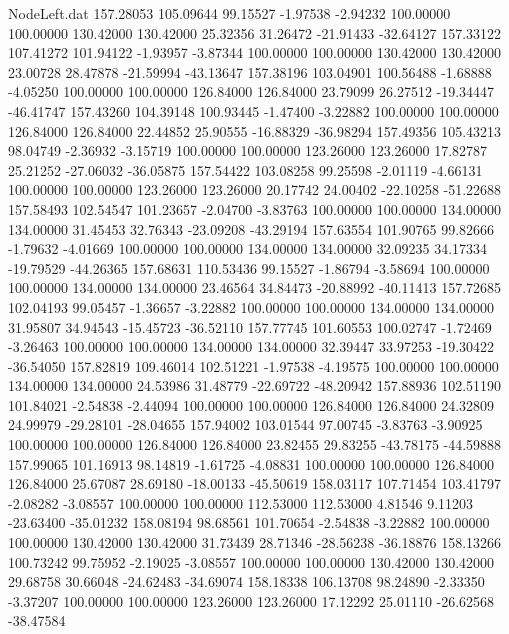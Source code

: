 \begin{filecontents}{NodeLeft.dat}
 157.28053  105.09644   99.15527    -1.97538   -2.94232  100.00000  100.00000  130.42000  130.42000   25.32356   31.26472  -21.91433  -32.64127
 157.33122  107.41272  101.94122    -1.93957   -3.87344  100.00000  100.00000  130.42000  130.42000   23.00728   28.47878  -21.59994  -43.13647
 157.38196  103.04901  100.56488    -1.68888   -4.05250  100.00000  100.00000  126.84000  126.84000   23.79099   26.27512  -19.34447  -46.41747
 157.43260  104.39148  100.93445    -1.47400   -3.22882  100.00000  100.00000  126.84000  126.84000   22.44852   25.90555  -16.88329  -36.98294
 157.49356  105.43213   98.04749    -2.36932   -3.15719  100.00000  100.00000  123.26000  123.26000   17.82787   25.21252  -27.06032  -36.05875
 157.54422  103.08258   99.25598    -2.01119   -4.66131  100.00000  100.00000  123.26000  123.26000   20.17742   24.00402  -22.10258  -51.22688
 157.58493  102.54547  101.23657    -2.04700   -3.83763  100.00000  100.00000  134.00000  134.00000   31.45453   32.76343  -23.09208  -43.29194
 157.63554  101.90765   99.82666    -1.79632   -4.01669  100.00000  100.00000  134.00000  134.00000   32.09235   34.17334  -19.79529  -44.26365
 157.68631  110.53436   99.15527    -1.86794   -3.58694  100.00000  100.00000  134.00000  134.00000   23.46564   34.84473  -20.88992  -40.11413
 157.72685  102.04193   99.05457    -1.36657   -3.22882  100.00000  100.00000  134.00000  134.00000   31.95807   34.94543  -15.45723  -36.52110
 157.77745  101.60553  100.02747    -1.72469   -3.26463  100.00000  100.00000  134.00000  134.00000   32.39447   33.97253  -19.30422  -36.54050
 157.82819  109.46014  102.51221    -1.97538   -4.19575  100.00000  100.00000  134.00000  134.00000   24.53986   31.48779  -22.69722  -48.20942
 157.88936  102.51190  101.84021    -2.54838   -2.44094  100.00000  100.00000  126.84000  126.84000   24.32809   24.99979  -29.28101  -28.04655
 157.94002  103.01544   97.00745    -3.83763   -3.90925  100.00000  100.00000  126.84000  126.84000   23.82455   29.83255  -43.78175  -44.59888
 157.99065  101.16913   98.14819    -1.61725   -4.08831  100.00000  100.00000  126.84000  126.84000   25.67087   28.69180  -18.00133  -45.50619
 158.03117  107.71454  103.41797    -2.08282   -3.08557  100.00000  100.00000  112.53000  112.53000    4.81546    9.11203  -23.63400  -35.01232
 158.08194   98.68561  101.70654    -2.54838   -3.22882  100.00000  100.00000  130.42000  130.42000   31.73439   28.71346  -28.56238  -36.18876
 158.13266  100.73242   99.75952    -2.19025   -3.08557  100.00000  100.00000  130.42000  130.42000   29.68758   30.66048  -24.62483  -34.69074
 158.18338  106.13708   98.24890    -2.33350   -3.37207  100.00000  100.00000  123.26000  123.26000   17.12292   25.01110  -26.62568  -38.47584

\end{filecontents}
